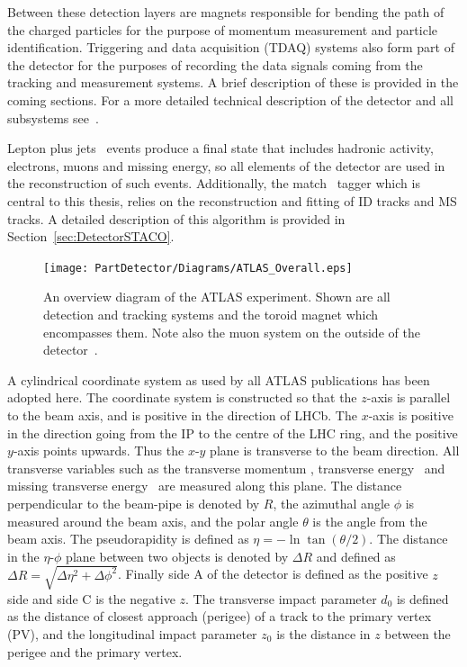 Between these detection layers are magnets responsible for bending the path of the charged particles for the purpose of momentum measurement and particle identification. Triggering and data acquisition (TDAQ) systems also form part of the detector for the purposes of recording the data signals coming from the tracking and measurement systems. A brief description of these is provided in the coming sections. For a more detailed technical description of the detector and all subsystems see~\cite{Detector:ATLASExperimentGeneral}.

Lepton plus jets \ttbar\ events produce a final state that includes hadronic activity, electrons, muons and missing energy, so all elements of the detector are used in the reconstruction of such events. Additionally, the match \xsm\ tagger which is central to this thesis, relies on the reconstruction and fitting of ID tracks and MS tracks. A detailed description of this algorithm is provided in Section~\ref{sec:DetectorSTACO}.

\begin{figure}[htbp]
  \centering
    \texttt{[image: PartDetector/Diagrams/ATLAS\_Overall.eps]}
    \caption[An overview diagram of the ATLAS experiment. Shown are all detection and tracking systems and the toroid magnet which encompasses them. Note also the muon system on the outside of the detector.]{An overview diagram of the ATLAS experiment. Shown are all detection and tracking systems and the toroid magnet which encompasses them. Note also the muon system on the outside of the detector~\cite{Detector:ATLASExperimentGeneral}.}\label{fig:ATLASOverviewFigure}
\end{figure}

A cylindrical coordinate system as used by all ATLAS publications has been adopted here. The coordinate system is constructed so that the $z$-axis is parallel to the beam axis, and is positive in the direction of LHCb. The $x$-axis is positive in the direction going from the IP to the centre of the LHC ring, and the positive $y$-axis points upwards. Thus the $x$-$y$ plane is transverse to the beam direction. All transverse variables such as the transverse momentum \pt, transverse energy \Et\ and missing transverse energy \met\ are measured along this plane. The distance perpendicular to the beam-pipe is denoted by $R$, the azimuthal angle $\phi$ is measured around the beam axis, and the polar angle $\theta$ is the angle from the beam axis. The pseudorapidity is defined as $\eta=-\ln\tan(\theta/2)$. The distance in the $\eta$-$\phi$ plane between two objects is denoted by $\Delta R$ and defined as $\Delta R = \sqrt{\Delta\eta^{2}+\Delta\phi^{2}}$. Finally side A of the detector is defined as the positive $z$ side and side C is the negative $z$.  The transverse impact parameter $d_{0}$ is defined as the distance of closest approach (perigee) of a track to the primary vertex (PV), and the longitudinal impact parameter $z_{0}$ is the distance in $z$ between the perigee and the primary vertex.

